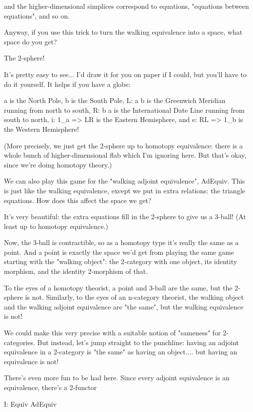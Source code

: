 and the higher-dimensional simplices correspond to equations, "equations
between equations", and so on.  

Anyway, if you use this trick to turn the walking equivalence into
a space, what space do you get?  

The 2-sphere!  

It's pretty easy to see... I'd draw it for you on paper if I could, but
you'll have to do it yourself.  It helps if you have a globe:

a is the North Pole, 
b is the South Pole, 
L: a \to  b is the Greenwich Meridian running from north to south, 
R: b \to  a is the International Date Line running from south to north, 
i: 1_{a} => LR is the Eastern Hemisphere, and 
e: RL => 1_{b} is the Western Hemisphere!

(More precisely, we just get the 2-sphere up to homotopy equivalence:
there is a whole bunch of higher-dimensional flab which I'm ignoring
here.  But that's okay, since we're doing homotopy theory.)

We can also play this game for the "walking adjoint equivalence",
AdEquiv.  This is just like the walking equivalence, except we put in
extra relations: the triangle equations.  How does this affect the space
we get?

It's very beautiful: the extra equations fill in the 2-sphere to give us
a 3-ball!  (At least up to homotopy equivalence.)


Now, the 3-ball is contractible, so as a homotopy type it's really the
same as a point.  And a point is exactly the space we'd get from playing
the same game starting with the "walking object": the
2-category with one object, its identity morphism, and the identity
2-morphism of that.


To the eyes of a homotopy theorist, a point and 3-ball are the same, but
the 2-sphere is not.  Similarly, to the eyes of an n-category theorist,
the walking object and the walking adjoint equivalence are "the
same", but the walking equivalence is not!


We could make this very precise with a suitable notion of
"sameness" for 2-categories.  But instead, let's jump straight
to the punchline: having an adjoint equivalence in a 2-category is
"the same" as having an object.... but having an equivalence
is not!

There's even more fun to be had here.  Since every adjoint equivalence
is an equivalence, there's a 2-functor

I: Equiv \to  AdEquiv

